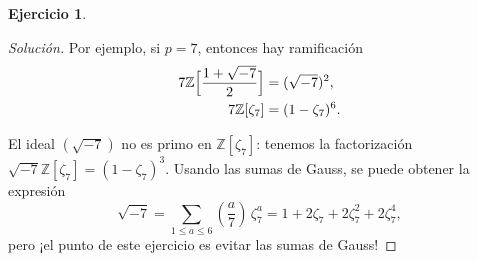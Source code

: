 \documentclass{article}
\newcounter{tarea}
\theoremstyle{definition}
\newtheorem{ejercicio}{Ejercicio}[tarea]
\newenvironment{solucion}{\begin{proof}[Solución]}{\end{proof}}
\newcommand{\ZZ}{\mathbb{Z}}
\begin{document}
\begin{ejercicio}
\begin{solucion}
    Por ejemplo, si $p = 7$, entonces hay ramificación
    \begin{align*}
      7 \ZZ \Bigl[\frac{1+\sqrt{-7}}{2}\Bigr] & = (\sqrt{-7})^2, \\
      7 \ZZ [\zeta_7] & = (1 - \zeta_7)^6.
    \end{align*}

    El ideal $(\sqrt{-7})$ no es primo en $\ZZ [\zeta_7]$: tenemos
    la factorización $\sqrt{-7} \ZZ [\zeta_7] = (1-\zeta_7)^3$.
    Usando las sumas de Gauss, se puede obtener la expresión
    \[ \sqrt{-7} =
       \sum_{1 \le a \le 6} \left(\frac{a}{7}\right)\,\zeta_7^a =
       1 + 2\zeta_7 + 2\zeta_7^2 + 2\zeta_7^4, \]
    pero ¡el punto de este ejercicio es evitar las sumas de Gauss!
  \end{solucion}
  \fi
\end{ejercicio}
\end{document}
